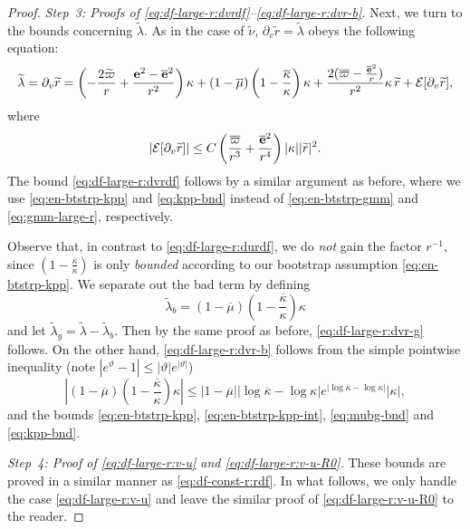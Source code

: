 \documentclass[10pt, reqno]{amsart}
\theoremstyle{definition}
\theoremstyle{remark}
\theoremstyle{conjecture}
\numberwithin{equation}{section}
\newcommand{\abs}[1]{\vert#1\vert}
\newcommand{\rd}{\partial}
\newcommand{\0}{\emptyset}
\newcommand{\kpp}{\kappa}
\newcommand{\lmb}{\lambda}
\newcommand{\bfe}{{\bf e}}
\newcommand{\calE}{\mathcal E}
\newcommand{\dur}{\nu}
\newcommand{\dvr}{\lmb}
\newcommand{\pfstep}[1]{\vspace{.5em} {\it \noindent #1.}}
\newcommand{\e}{\bfe}							%
\newcommand{\dvrbg}{\overline{\dvr}}				%
\newcommand{\durbg}{\overline{\dur}}				%
\newcommand{\rbg}{\overline{r}}					%
\newcommand{\varpibg}{\overline{\varpi}}				%
\newcommand{\mubg}{\overline{\mu}}				%
\newcommand{\kppbg}{\overline{\kpp}}					%
\newcommand{\ebg}{\overline{\e}}					%
\newcommand{\dvrdf}{\widetilde{\dvr}}				%
\newcommand{\durdf}{\widetilde{\dur}}				%
\newcommand{\rdf}{\widetilde{r}}					%
\newcommand{\varpidf}{\widetilde{\varpi}}				%
\newcommand{\Abs}[1]{\left\vert #1 \right\vert}
\begin{document}
\begin{proof}
\pfstep{Step~3: Proofs of \eqref{eq:df-large-r:dvrdf}--\eqref{eq:df-large-r:dvr-b}}
Next, we turn to the bounds concerning $\dvrdf$. As in the case of $\durdf$, $\rd_{v} \rdf = \dvrdf$ obeys the following equation:
\begin{equation} \label{eq:dvrdf-pre}
	\dvrdf = \rd_{v} \rdf = \left( - \frac{2 \varpidf}{r} + \frac{\e^{2} - \ebg^{2}}{r^{2}} \right) \kpp + (1-\mubg) \left( 1- \frac{\kppbg}{\kpp}\right) \kpp+ \frac{2(\varpibg - \frac{\ebg^{2}}{r})}{r^{2}} \kpp \, \rdf  + \calE[\rd_{v} \rdf],
\end{equation}
where
\begin{equation}\label{eq:dvrdf-pre-err}
	\Abs{\calE[\rd_{v} \rdf]} \leq C \left( \frac{\varpibg}{r^{3}} + \frac{\ebg^{2}}{r^{4}} \right) \abs{\kpp} \abs{\rdf}^{2}.
\end{equation}
The bound \eqref{eq:df-large-r:dvrdf} follows by a similar argument as before, where we use \eqref{eq:en-btstrp-kpp} and \eqref{eq:kpp-bnd} instead of \eqref{eq:en-btstrp-gmm} and \eqref{eq:gmm-large-r}, respectively. 

Observe that, in contrast to \eqref{eq:df-large-r:durdf}, we do \emph{not} gain the factor $r^{-1}$, since $\left(1 - \frac{\kppbg}{\kpp}\right)$ is only \emph{bounded} according to our bootstrap assumption \eqref{eq:en-btstrp-kpp}. We separate out the bad term by defining
\begin{equation*}
	\dvrdf_{b} = (1-\mubg) \left(1 - \frac{\kppbg}{\kpp}\right) \kpp
\end{equation*}
and let $\dvrdf_{g} = \dvrdf - \dvrdf_{b}$. Then by the same proof as before, \eqref{eq:df-large-r:dvr-g} follows. On the other hand, \eqref{eq:df-large-r:dvr-b} follows from the simple pointwise inequality (note $|e^\vartheta-1|\leq |\vartheta|e^{|\vartheta|}$)
\begin{equation*}
	\Abs{(1-\mubg) \left(1 - \frac{\kppbg}{\kpp}\right) \kpp}
	\leq \abs{1-\mubg} \abs{\log \kppbg - \log \kpp} e^{\abs{\log \kppbg - \log \kpp}} \abs{\kpp},
\end{equation*}
and the bounds \eqref{eq:en-btstrp-kpp}, \eqref{eq:en-btstrp-kpp-int}, \eqref{eq:mubg-bnd} and \eqref{eq:kpp-bnd}.

\pfstep{Step~4: Proof of \eqref{eq:df-large-r:v-u} and \eqref{eq:df-large-r:v-u-R0}}
These bounds are proved in a similar manner as \eqref{eq:df-const-r:rdf}. In what follows, we only handle the case \eqref{eq:df-large-r:v-u} and leave the similar proof of \eqref{eq:df-large-r:v-u-R0} to the reader. 


\end{proof}
\end{document}
